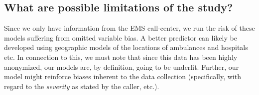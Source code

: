 \documentclass[twoside,11pt]{article}
\begin{document}
\subsection{What are possible limitations of the study?}
Since we only have information from the EMS call-center, we run the risk of these models suffering from omitted variable bias. A better predictor can likely be developed using geographic models of the locations of ambulances and hospitals etc. In connection to this, we must note that since this data has been highly anonymized, our models are, by definition, going to be underfit. Further, our model might reinforce biases inherent to the data collection (specifically, with regard to the \emph{severity} as stated by the caller, etc.). 

\newpage
\printbibliography
\end{document}
